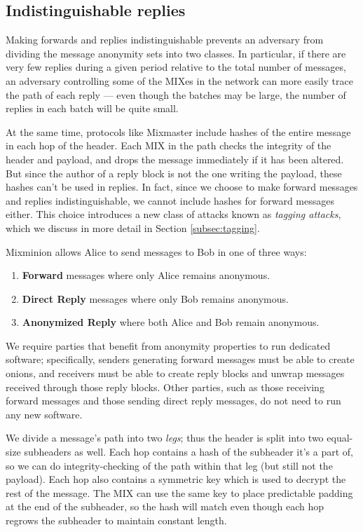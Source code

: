 \documentclass{llncs}
\begin{document}
\subsection{Indistinguishable replies}
\label{subsec:header-swap}

Making forwards and replies indistinguishable prevents an adversary from
dividing the message anonymity sets into two classes. In particular, if
there are very few replies during a given period relative to the total
number of messages, an adversary controlling some of the MIXes in the
network can more easily trace the path of each reply --- even though
the batches may be large, the number of replies in each batch will be
quite small.

At the same time, protocols like Mixmaster include hashes of the entire
message in each hop of the header. Each MIX in the path checks the
integrity of the header and payload, and drops the message immediately
if it has been altered. But since the author of a reply block is not the
one writing the payload, these hashes can't be used in replies. In fact,
since we choose to make forward messages and replies indistinguishable,
we cannot include hashes for forward messages either. This choice
introduces a new class of attacks known as \emph{tagging attacks},
which we discuss in more detail in Section \ref{subsec:tagging}.

Mixminion allows Alice to send messages to Bob in one of three ways:

\begin{enumerate}
\item \textbf{Forward} messages where only Alice remains anonymous.
\item \textbf{Direct Reply} messages where only Bob remains anonymous.
\item \textbf{Anonymized Reply} where both Alice and Bob remain anonymous.
\end{enumerate}

We require parties that benefit from anonymity properties to run dedicated
software; specifically, senders generating forward messages must be able
to create onions, and receivers must be able to create reply blocks
and unwrap messages received through those reply blocks. Other parties,
such as those receiving forward messages and those sending direct reply
messages, do not need to run any new software.


We divide a message's path into two \emph{legs}; thus the header is
split into two equal-size subheaders as well. Each hop contains a hash
of the subheader it's a part of, so we can do integrity-checking of the
path within that leg (but still not the payload). Each hop also contains
a symmetric key which is used to decrypt the rest of the message. The
MIX can use the same key to place predictable padding at the end of
the subheader, so the hash will match even though each hop regrows the
subheader to maintain constant length.
\end{document}
